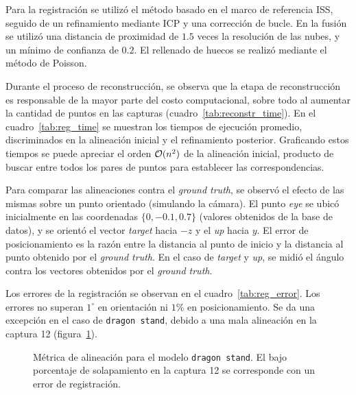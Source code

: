 		Para la registración se utilizó el método basado en el marco de referencia ISS, seguido de
		un refinamiento mediante ICP y una corrección de bucle.
		En la fusión se utilizó una distancia de proximidad de $1.5$ veces la resolución de las nubes,
		y un mínimo de confianza de $0.2$.
		El rellenado de huecos se realizó mediante el método de Poisson.


		Durante el proceso de reconstrucción, se observa que la etapa de reconstrucción
		es responsable de la mayor parte del costo computacional, sobre todo al aumentar
		la cantidad de puntos en las capturas (cuadro~\ref{tab:reconstr_time}).
		En el cuadro~\ref{tab:reg_time} se muestran
		los tiempos de ejecución promedio, discriminados en la alineación
		inicial y el refinamiento posterior.
		Graficando estos tiempos se puede apreciar el orden $\mathcal{O}(n^2)$ de la alineación inicial,
		producto de buscar entre todos los pares de puntos para establecer las correspondencias.
		

		

		Para comparar las alineaciones contra el \emph{ground truth}, se
		observó el efecto de las mismas sobre un punto orientado (simulando la
		cámara). El punto \emph{eye} se ubicó inicialmente en las coordenadas
		$\{0, -0.1, 0.7\}$ (valores obtenidos de la base de datos), y se
		orientó el vector \emph{target} hacia $-z$ y el \emph{up} hacia $y$.
		El error de posicionamiento es la razón entre la distancia al punto
		de inicio y la distancia al punto obtenido por el \emph{ground truth}.
		En el caso de \emph{target} y \emph{up}, se midió el ángulo contra los
		vectores obtenidos por el \emph{ground truth}.

		Los errores de la registración se observan en el
		cuadro~\ref{tab:reg_error}.  Los errores no superan $1^{\circ}$ en
		orientación ni $1\%$ en posicionamiento.  Se da una excepción en el
		caso de \texttt{dragon stand}, debido a una mala alineación en la
		captura 12 (figura~\ref{fig:fitness}).

		

		\begin{figure}
			\center
				\resizebox{\linewidth}{!}{}
			\caption{\label{fig:fitness}Métrica de alineación para el modelo \texttt{dragon stand}. El bajo
			porcentaje de solapamiento en la captura 12 se corresponde
			con un error de registración.}
		\end{figure}



